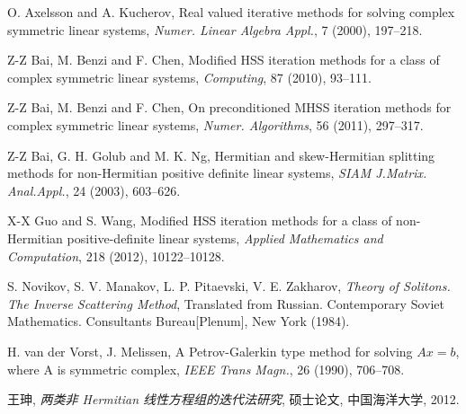 \documentclass[UTF8]{ctexart}
\theoremstyle{plain}
\theoremstyle{nonumberplain}
\numberwithin{equation}{section} %
\begin{document}
\begin{thebibliography}{99}

\newblock O. Axelsson and A. Kucherov,
\newblock Real valued iterative methods for solving complex symmetric linear systems,
\newblock \emph{Numer. Linear Algebra Appl.}, 7 (2000), 197--218.


\newblock Z-Z Bai, M. Benzi and F. Chen,
\newblock Modified HSS iteration methods for a class of complex symmetric linear systems,
\newblock \emph{Computing}, 87 (2010), 93--111.

\newblock Z-Z Bai, M. Benzi and F. Chen,
\newblock On preconditioned MHSS iteration methods for complex symmetric linear systems,
\newblock \emph{Numer. Algorithms}, 56 (2011), 297--317.

\newblock Z-Z Bai, G. H. Golub and M. K. Ng,
\newblock Hermitian and skew-Hermitian splitting methods for non-Hermitian 
  positive definite linear systems,
\newblock \emph{SIAM J.Matrix. Anal.Appl.}, 24 (2003), 603--626.

\newblock X-X Guo and S. Wang,
\newblock Modified HSS iteration methods for a class of non-Hermitian
  positive-definite linear systems,
\newblock \emph{Applied Mathematics and Computation}, 218 (2012), 10122--10128.

\newblock S. Novikov, S. V. Manakov, L. P. Pitaevski, V. E. Zakharov,
\newblock \emph{Theory of Solitons. The Inverse Scattering Method},
\newblock Translated from Russian. Contemporary Soviet Mathematics. Consultants Bureau[Plenum], New York (1984).

\newblock H. van der Vorst, J. Melissen,
\newblock A Petrov-Galerkin type method for solving $Ax=b$, where A is symmetric complex,
\newblock \emph{IEEE Trans Magn.}, 26 (1990), 706--708.

\newblock 王珅,
\newblock \emph{两类非 Hermitian 线性方程组的迭代法研究}, 
\newblock 硕士论文, 中国海洋大学, 2012.

\end{thebibliography}
\end{document}
